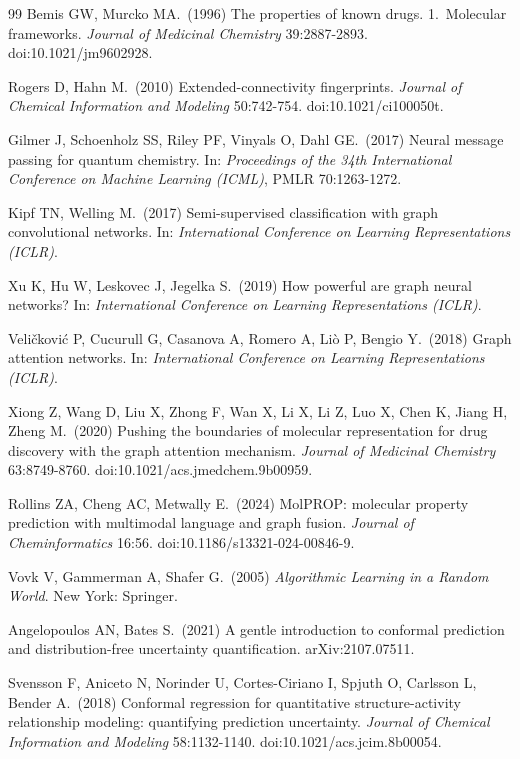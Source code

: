 \begin{thebibliography}{99}
Bemis GW, Murcko MA.\ (1996)
The properties of known drugs. 1.\ Molecular frameworks.
\emph{Journal of Medicinal Chemistry} 39:2887-2893.
doi:10.1021/jm9602928.

Rogers D, Hahn M.\ (2010)
Extended-connectivity fingerprints.
\emph{Journal of Chemical Information and Modeling} 50:742-754.
doi:10.1021/ci100050t.

Gilmer J, Schoenholz SS, Riley PF, Vinyals O, Dahl GE.\ (2017)
Neural message passing for quantum chemistry.
In: \emph{Proceedings of the 34th International Conference on Machine Learning (ICML)}, PMLR 70:1263-1272.

Kipf TN, Welling M.\ (2017)
Semi-supervised classification with graph convolutional networks.
In: \emph{International Conference on Learning Representations (ICLR)}.

Xu K, Hu W, Leskovec J, Jegelka S.\ (2019)
How powerful are graph neural networks?
In: \emph{International Conference on Learning Representations (ICLR)}.

Veli{\v{c}}kovi{\'c} P, Cucurull G, Casanova A, Romero A, Li{\`o} P, Bengio Y.\ (2018)
Graph attention networks.
In: \emph{International Conference on Learning Representations (ICLR)}.

Xiong Z, Wang D, Liu X, Zhong F, Wan X, Li X, Li Z, Luo X, Chen K, Jiang H, Zheng M.\ (2020)
Pushing the boundaries of molecular representation for drug discovery with the graph attention mechanism.
\emph{Journal of Medicinal Chemistry} 63:8749-8760.
doi:10.1021/acs.jmedchem.9b00959.

Rollins ZA, Cheng AC, Metwally E.\ (2024)
MolPROP: molecular property prediction with multimodal language and graph fusion.
\emph{Journal of Cheminformatics} 16:56.
doi:10.1186/s13321-024-00846-9.

Vovk V, Gammerman A, Shafer G.\ (2005)
\emph{Algorithmic Learning in a Random World}.
New York: Springer.

Angelopoulos AN, Bates S.\ (2021)
A gentle introduction to conformal prediction and distribution-free uncertainty quantification.
arXiv:2107.07511.

Svensson F, Aniceto N, Norinder U, Cortes-Ciriano I, Spjuth O, Carlsson L, Bender A.\ (2018)
Conformal regression for quantitative structure-activity relationship modeling: quantifying prediction uncertainty.
\emph{Journal of Chemical Information and Modeling} 58:1132-1140.
doi:10.1021/acs.jcim.8b00054.

\end{thebibliography}
